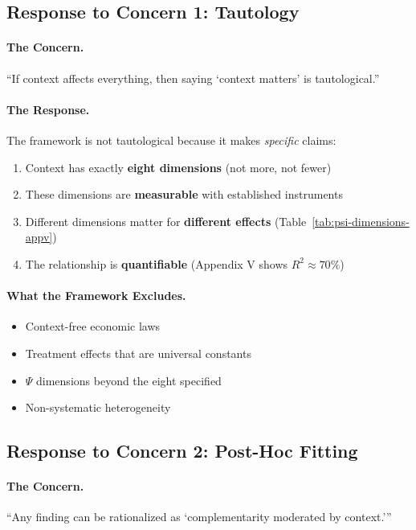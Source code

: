 \documentclass[12pt,a4paper]{article}
\begin{document}
\subsection{Response to Concern 1: Tautology}

\paragraph{The Concern.}
``If context affects everything, then saying `context matters' is tautological.''

\paragraph{The Response.}
The framework is not tautological because it makes \textit{specific} claims:
\begin{enumerate}
    \item Context has exactly \textbf{eight dimensions} (not more, not fewer)
    \item These dimensions are \textbf{measurable} with established instruments
    \item Different dimensions matter for \textbf{different effects} (Table~\ref{tab:psi-dimensions-appv})
    \item The relationship is \textbf{quantifiable} (Appendix V shows $R^2 \approx 70\%$)
\end{enumerate}

\paragraph{What the Framework Excludes.}
\begin{itemize}
    \item Context-free economic laws
    \item Treatment effects that are universal constants
    \item $\Psi$ dimensions beyond the eight specified
    \item Non-systematic heterogeneity
\end{itemize}

\subsection{Response to Concern 2: Post-Hoc Fitting}

\paragraph{The Concern.}
``Any finding can be rationalized as `complementarity moderated by context.'''
\end{document}
